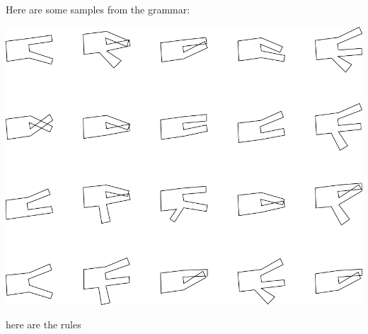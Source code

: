 Here are some samples from the grammar:

\includegraphics[width=6in]{output/1.models/hand_built/hand/samples.png}

here are the rules

